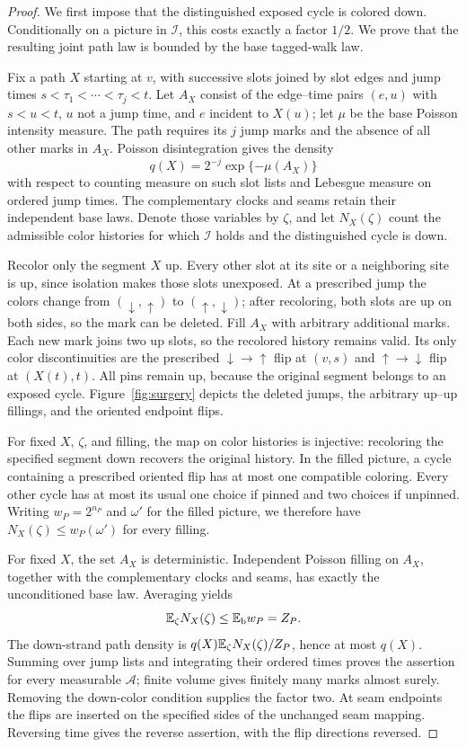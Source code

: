 \begin{proof}
We first impose that the distinguished exposed cycle is colored down.
Conditionally on a picture in $\mathcal I$, this costs exactly a factor
$1/2$.  We prove that the resulting joint path law is bounded by the
base tagged-walk law.

Fix a path $X$ starting at $v$, with successive slots joined by slot
edges and jump times $s<\tau_1<\cdots<\tau_j<t$.
Let $A_X$ consist of the edge--time pairs $(e,u)$ with $s<u<t$,
$u$ not a jump time, and $e$ incident to $X(u)$; let $\mu$ be the base
Poisson intensity measure.  The path requires its $j$ jump marks and
the absence of all other marks in $A_X$.  Poisson disintegration gives
the density
\[
 q(X)=2^{-j}\exp\{-\mu(A_X)\}
\]
with respect to counting measure on such slot lists and Lebesgue
measure on ordered jump times.  The complementary clocks and seams
retain their independent base laws.  Denote those variables by $\zeta$,
and let $N_X(\zeta)$ count the admissible color histories for which
$\mathcal I$ holds and the distinguished cycle is down.

Recolor only the segment $X$ up.  Every other slot at its site or a
neighboring site is up, since isolation makes those slots unexposed.
At a prescribed jump the colors change from
$(\downarrow,\uparrow)$ to $(\uparrow,\downarrow)$; after recoloring,
both slots are up on both sides, so the mark can be deleted.  Fill
$A_X$ with arbitrary additional marks.  Each new mark joins two up
slots, so the recolored history remains valid.  Its only color
discontinuities are the prescribed $\downarrow\!\to\!\uparrow$ flip
at $(v,s)$ and $\uparrow\!\to\!\downarrow$ flip at $(X(t),t)$.
All pins remain up, because the original segment belongs to an
exposed cycle.  Figure~\ref{fig:surgery} depicts the deleted jumps,
the arbitrary up--up fillings, and the oriented endpoint flips.

For fixed $X$, $\zeta$, and filling, the map on color histories is
injective: recoloring the specified segment down recovers the original
history.  In the filled picture, a cycle containing a prescribed
oriented flip has at most one compatible coloring.  Every other cycle
has at most its usual one choice if pinned and two choices if unpinned.
Writing $w_P=2^{n_P}$ and $\omega'$ for the filled picture, we therefore
have $N_X(\zeta)\le w_P(\omega')$ for every filling.

For fixed $X$, the set $A_X$ is deterministic.  Independent Poisson
filling on $A_X$, together with the complementary clocks and seams,
has exactly the unconditioned base law.  Averaging yields
\[
 \mathbb E_\zeta N_X(\zeta)\le\mathbb E_{\mathrm b}w_P=Z_P.
\]
The down-strand path density is
$q(X)\mathbb E_\zeta N_X(\zeta)/Z_P$, hence at most $q(X)$.
Summing over jump lists and integrating their ordered times proves
the assertion for every measurable $\mathcal A$; finite volume gives
finitely many marks almost surely.  Removing the down-color condition
supplies the factor two.  At seam endpoints the flips are inserted on
the specified sides of the unchanged seam mapping.  Reversing time
gives the reverse assertion, with the flip directions reversed.
\end{proof}


